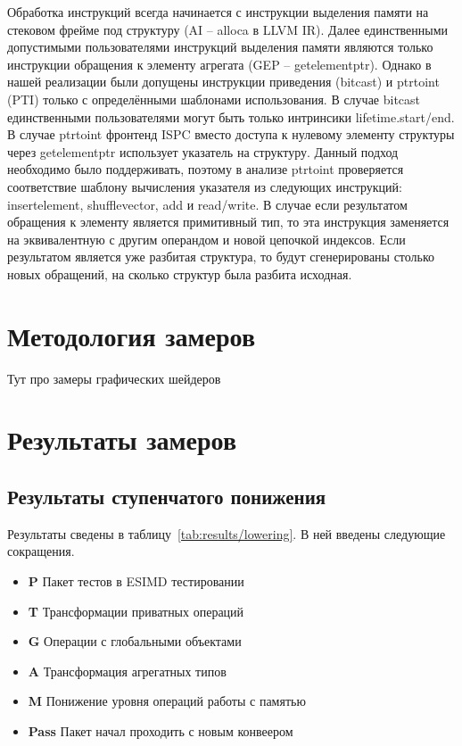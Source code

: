 Обработка инструкций всегда начинается с инструкции выделения памяти на стековом фрейме под структуру (AI -- alloca в LLVM IR).
Далее единственными допустимыми пользователями инструкций выделения памяти являются только инструкции обращения к элементу агрегата (GEP -- getelementptr).
Однако в нашей реализации были допущены инструкции приведения (bitcast) и ptrtoint (PTI) только с определёнными шаблонами использования.
В случае bitcast единственными пользователями могут быть только интринсики lifetime.start/end.
В случае ptrtoint фронтенд ISPC вместо доступа к нулевому элементу структуры через getelementptr использует указатель на структуру.
Данный подход необходимо было поддерживать, поэтому в анализе ptrtoint проверяется соответствие шаблону вычисления указателя из следующих инструкций: insertelement, shufflevector, add и read/write.
В случае если результатом обращения к элементу является примитивный тип, то эта инструкция заменяется на эквивалентную с другим операндом и новой цепочкой индексов.
Если результатом является уже разбитая структура, то будут сгенерированы столько новых обращений, на сколько структур была разбита исходная.


\section{Методология замеров}\label{sec:results/measures}

Тут про замеры графических шейдеров

\section{Результаты замеров}\label{sec:results/results}

\subsection{Результаты ступенчатого понижения}\label{subsec:results/results/lowering}

Результаты сведены в таблицу~\cref{tab:results/lowering}. В ней введены следующие сокращения.

\begin{itemize}
\item \textbf{P} Пакет тестов в ESIMD тестировании
\item \textbf{T} Трансформации приватных операций
\item \textbf{G} Операции с глобальными объектами
\item \textbf{A} Трансформация агрегатных типов
\item \textbf{M} Понижение уровня операций работы с памятью
\item \textbf{Pass} Пакет начал проходить с новым конвеером
\end{itemize}

